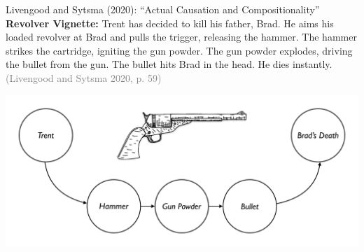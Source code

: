 \documentclass[xcolor=table,9pt,aspectratio=169]{beamer}
\begin{document}
\begin{frame}{\vspace*{10mm}Livengood and Sytsma (2020): ``Actual Causation and Compositionality''}
\vspace*{-5mm}
\textbf{Revolver Vignette:} Trent has decided to kill his father, Brad. He aims his loaded revolver at Brad and pulls the trigger, releasing the hammer. The hammer strikes the cartridge, igniting the gun powder. The gun powder explodes, driving the bullet from the gun. The bullet hits Brad in the head. He dies instantly. \textcolor{gray}{(Livengood and Sytsma 2020, p. 59)}
\begin{center}
   \includegraphics[width=0.75\linewidth]{figures/revolver_2.pdf}
\end{center}
\end{frame}
\end{document}
